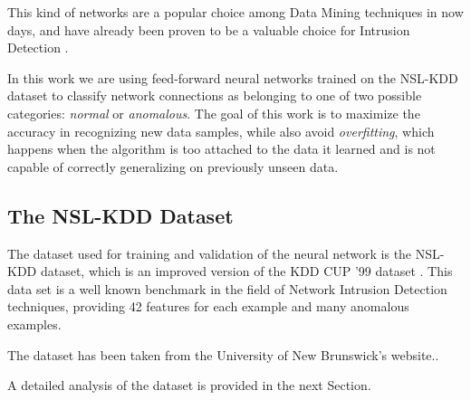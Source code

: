 This kind of networks are a popular choice among Data Mining techniques in now days, and have already been proven to be a valuable choice for Intrusion Detection \cite{nnids,nnids2}.

In this work we are using feed-forward neural networks trained on the NSL-KDD dataset to classify network connections as belonging to one of two possible categories: \textit{normal} or \textit{anomalous}. The goal of this work is to maximize the accuracy in recognizing new data samples, while also avoid \textit{overfitting}, which happens when the algorithm is too attached to the data it learned and is not capable of correctly generalizing on previously unseen data.

\subsection{The NSL-KDD Dataset}

The dataset used for training and validation of the neural network is the NSL-KDD dataset, which is an improved version of the KDD CUP '99 dataset \cite{nslkdd, nslkdd2}. This data set is a well known benchmark in the field of Network Intrusion Detection techniques, providing 42 features for each example and many anomalous examples.

The dataset has been taken from the University of New Brunswick's website.\cite{dataset}.

A detailed analysis of the dataset is provided in the next Section.